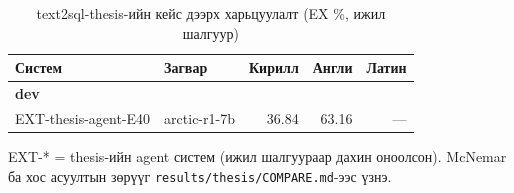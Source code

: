 \begin{table}[H]\centering\small
\caption{text2sql-thesis-ийн кейс дээрх харьцуулалт (EX \%, ижил шалгуур)}\label{tab:thesis-compare}
\begin{tabular}{llrrr}\toprule Систем & Загвар & Кирилл & Англи & Латин \\\midrule
\multicolumn{5}{l}{\textbf{dev}}\\
EXT-thesis-agent-E40 & arctic-r1-7b & 36.84 & 63.16 & — \\
\bottomrule\end{tabular}
\par\smallskip\footnotesize EXT-* = thesis-ийн agent систем (ижил шалгуураар дахин оноолсон). McNemar ба хос асуултын зөрүүг \texttt{results/thesis/COMPARE.md}-ээс үзнэ.
\end{table}
